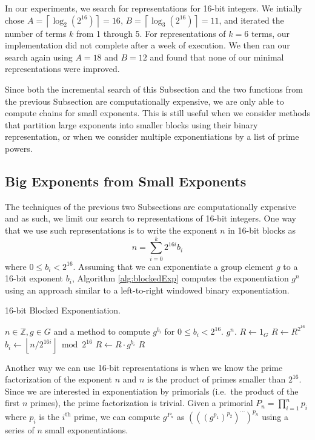 \documentclass{ucalgthes1}
\theoremstyle{definition}
\newcommand{\ZZ}{\mathbb{Z}}
\newcommand{\floor}[1]{\left\lfloor #1 \right\rfloor}
\newcommand{\ceil}[1]{\left\lceil #1 \right\rceil}
\begin{document}
In our experiments, we search for representations for 16-bit integers. We intially chose $A = \ceil{\log_2\left(2^{16}\right)} = 16$, $B = \ceil{\log_3 \left(2^{16}\right)} = 11$, and iterated the number of terms $k$ from 1 through 5. For representations of $k = 6$ terms, our implementation did not complete after a week of execution.  We then ran our search again using $A=18$ and $B=12$ and found that none of our minimal representations were improved.

Since both the incremental search of this Subsection and the two functions from the previous Subsection are computationally expensive, we are only able to compute chains for small exponents.  This is still useful when we consider methods that partition large exponents into smaller blocks using their binary representation, or when we consider multiple exponentiations by a list of prime powers.


\subsection{Big Exponents from Small Exponents}

The techniques of the previous two Subsections are computationally expensive and as such, we limit our search to representations of 16-bit integers.  One way that we use such representations is to write the exponent $n$ in 16-bit blocks as
\[
	n = \sum_{i=0}^k 2^{16i} b_i
\]
where $0 \le b_i < 2^{16}$.  Assuming that we can exponentiate a group element $g$ to a 16-bit exponent $b_i$, Algorithm \ref{alg:blockedExp} computes the exponentiation $g^n$ using an approach similar to a left-to-right windowed binary exponentiation.

\begin{algorithm}[H]
\caption{16-bit Blocked Exponentiation.}
\label{alg:blockedExp}
\begin{algorithmic}[1]
\REQUIRE $n \in \ZZ, g \in G$ and a method to compute $g^{b_i}$ for $0 \le b_i < 2^{16}$.
\ENSURE $g^n$.
\STATE $R \gets 1_G$
\FOR {$i$ from $\ceil{\log_{2^{16}} n}$ downto 0}
	\STATE $R \gets R^{2^{16}}$ 
	\STATE $b_i \gets \floor{n / 2^{16i}} \bmod {2^{16}}$
	\STATE $R \gets R \cdot g^{b_i}$
\ENDFOR
\RETURN $R$
\end{algorithmic}
\end{algorithm}

Another way we can use 16-bit representations is when we know the prime factorization of the exponent $n$ and $n$ is the product of primes smaller than $2^{16}$.  Since we are interested in exponentiation by primorials (i.e.\ the product of the first $n$ primes), the prime factorization is trivial. Given a primorial $P_n = \prod_{i=1}^n p_i$ where $p_i$ is the $i^{\textrm{th}}$ prime, we can compute $g^{P_n}$ as $(((g^{p_1})^{p_2})^{\cdots})^{p_n}$ using a series of $n$ small exponentiations.
\end{document}
